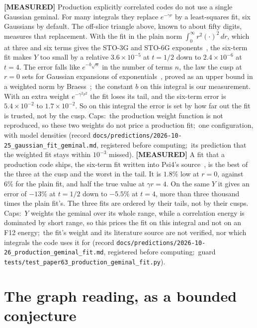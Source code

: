 \documentclass[aps,pra,twocolumn,superscriptaddress,longbibliography]{revtex4-2}
\begin{document}
\textbf{[MEASURED]} Production explicitly correlated codes do not use a
single Gaussian geminal.  For many integrals they replace $e^{-\gamma r}$ by
a least-squares fit, six Gaussians by default.  The off-slice triangle above,
known to about fifty digits, measures that replacement.  With the fit in the
plain norm $\int_0^\infty r^2(\cdot)^2\,dr$, which at three and six terms gives
the STO-3G and STO-6G exponents~\cite{hehre1969}, the six-term fit makes $Y$ too small by a relative
$3.6\times10^{-5}$ at $t=1/2$ down to $2.4\times10^{-6}$ at $t=4$.  The error
falls like $e^{-b\sqrt{n}}$ in the number of terms $n$, the law the cusp at
$r=0$ sets for Gaussian expansions of exponentials~\cite{kutzelnigg1994}, proved
as an upper bound in a weighted norm by Braess~\cite{braess1995};\ the constant
$b$ on this integral is our measurement.  With an extra weight $e^{-\gamma^2r^2}$ the fit loses its tail, and
the six-term error is $5.4\times10^{-2}$ to $1.7\times10^{-2}$.  So on this
integral the error is set by how far out the fit is trusted, not by the cusp.
Caps:\ the production weight function is not reproduced, so these two weights
do not price a production fit;\ one configuration, with model densities (record
\texttt{docs/predictions/2026-10-25\_gaussian\_fit\_geminal.md}, registered
before computing;\ its prediction that the weighted fit stays within
$10^{-3}$ missed).
\textbf{[MEASURED]} A fit that a production code ships, the six-term fit
written into Psi4's source~\cite{psi4_2020}, is the best of the three at the
cusp and the worst in the tail.  It is $1.8\%$ low at $r=0$, against $6\%$ for
the plain fit, and half the true value at $\gamma r=4$.  On the same $Y$ it
gives an error of $-13\%$ at $t=1/2$ down to $-5.5\%$ at $t=4$, more than three
thousand times the plain fit's.  The three fits are ordered by their tails,
not by their cusps.  Caps:\ $Y$ weights the geminal over its whole range,
while a correlation energy is dominated by short range, so this prices the
fit on this integral and not on an F12 energy;\ the fit's weight and its
literature source are not verified, nor which integrals the code uses it for
(record \texttt{docs/predictions/2026-10-26\_production\_geminal\_fit.md},
registered before computing;\ guard \texttt{tests/test\_paper63\_production\_geminal\_fit.py}).


\section{The graph reading, as a bounded conjecture}
\label{sec:conjecture}
\end{document}
